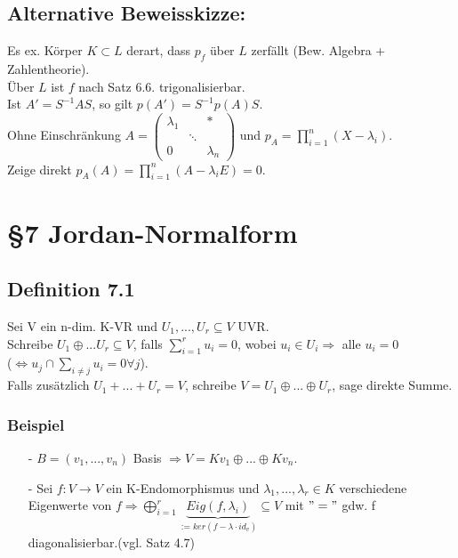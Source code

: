 \documentclass[a4paper, 12pt]{extarticle}
\begin{document}
\subsection*{Alternative Beweisskizze:}
Es ex. Körper $K \subset L$ derart, dass $p_f$ über $L$ zerfällt (Bew. Algebra + Zahlentheorie).\\
Über $L$ ist $f$ nach Satz 6.6. trigonalisierbar.\\
Ist $A' = S^{-1}AS$, so gilt $p(A') = S^{-1}p(A)S$.\\
Ohne Einschränkung $A = \left(\begin{matrix}
	\lambda_1 &  & *\\
	 & \ddots & \\
	0 & & \lambda_n
\end{matrix}\right)$ und $p_A = \prod_{i=1}^{n}(X-\lambda_i)$.\\
Zeige direkt $p_A(A) = \prod_{i=1}^{n}(A-\lambda_iE) = 0$.
\section*{§7 Jordan-Normalform}
\subsection*{Definition 7.1}
Sei V ein n-dim. K-VR und $U_1, ..., U_r \subseteq V$ UVR.\\
Schreibe $U_1 \oplus ... U_r \subseteq V$,
falls $\sum_{i=1}^{r} u_i = 0$, wobei  $u_i \in U_i \Rightarrow$ alle $u_i = 0$\\
($\Leftrightarrow u_j \cap \sum_{i \neq j}u_i = {0}  \forall j$).\\
Falls zusätzlich $U_1 + ... + U_r = V$, schreibe $V = U_1 \oplus ... \oplus U_r$, sage direkte Summe.
\subsubsection*{Beispiel}
\begin{itemize}
\item[-]
$B = (v_1, ..., v_n)$ Basis $\Rightarrow V = Kv_1 \oplus ... \oplus Kv_n$.
\item[-]
Sei $f: V \rightarrow V$ ein K-Endomorphismus und $\lambda_1 , ... , \lambda_r \in K$ verschiedene Eigenwerte von $f \Rightarrow  \bigoplus_{i=1}^{r} \underbrace{Eig(f, \lambda_i)}_{:= ker(f-\lambda \cdot id_v)} \subseteq
 V$ mit $"="$ gdw. f diagonalisierbar.(vgl. Satz 4.7)
\end{itemize}
\end{document}
